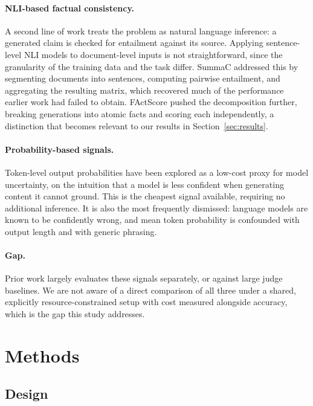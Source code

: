 \documentclass[11pt,a4paper]{article}
\begin{document}
\paragraph{NLI-based factual consistency.}
A second line of work treats the problem as natural language inference: a
generated claim is checked for entailment against its source. Applying
sentence-level NLI models to document-level inputs is not straightforward, since
the granularity of the training data and the task differ. SummaC
\cite{laban2022summac} addressed this by segmenting documents into sentences,
computing pairwise entailment, and aggregating the resulting matrix, which
recovered much of the performance earlier work had failed to obtain. FActScore
\cite{min2023factscore} pushed the decomposition further, breaking generations
into atomic facts and scoring each independently, a distinction that becomes
relevant to our results in Section~\ref{sec:results}.

\paragraph{Probability-based signals.}
Token-level output probabilities have been explored as a low-cost proxy for
model uncertainty, on the intuition that a model is less confident when
generating content it cannot ground. This is the cheapest signal available,
requiring no additional inference. It is also the most frequently dismissed:
language models are known to be confidently wrong, and mean token probability
is confounded with output length and with generic phrasing.

\paragraph{Gap.}
Prior work largely evaluates these signals separately, or against large judge
baselines. We are not aware of a direct comparison of all three under a shared,
explicitly resource-constrained setup with cost measured alongside accuracy,
which is the gap this study addresses.

\section{Methods}

\subsection{Design}
\end{document}
